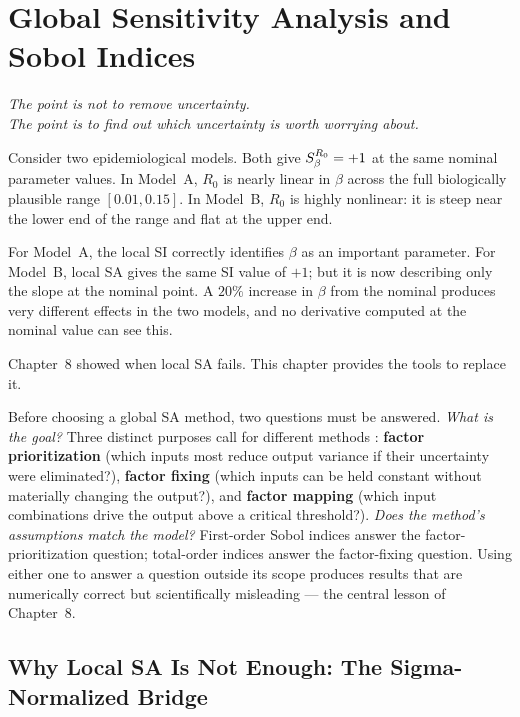 \chapter{Global Sensitivity Analysis and Sobol Indices}

\begin{flushright}
\textit{The point is not to remove uncertainty.\\
The point is to find out which uncertainty is worth worrying about.}
\end{flushright}

\bigskip

Consider two epidemiological models. Both give $S_{\beta}^{R_0} = +1$
at the same nominal parameter values. In Model~A, $R_0$ is nearly linear
in $\beta$ across the full biologically plausible range $[0.01, 0.15]$.
In Model~B, $R_0$ is highly nonlinear: it is steep near the lower end
of the range and flat at the upper end.

For Model~A, the local SI correctly identifies $\beta$ as an important
parameter. For Model~B, local SA gives the same SI value of $+1$;
but it is now describing only the slope at the nominal point.
A $20\%$ increase in $\beta$ from the nominal produces very different
effects in the two models, and no derivative computed at the nominal
value can see this.

Chapter~8 showed when local SA fails. This chapter provides the tools
to replace it.

Before choosing a global SA method, two questions must be answered.
\textit{What is the goal?} Three distinct purposes call for different methods
\cite{saltelli2004sensitivity,saltelli2008global}: \textbf{factor prioritization} (which inputs
most reduce output variance if their uncertainty were eliminated?),
\textbf{factor fixing} (which inputs can be held constant without materially
changing the output?), and \textbf{factor mapping} (which input combinations
drive the output above a critical threshold?).
\textit{Does the method's assumptions match the model?}
First-order Sobol indices answer the factor-prioritization question;
total-order indices answer the factor-fixing question.
Using either one to answer a question outside its scope produces results
that are numerically correct but scientifically misleading ---
the central lesson of Chapter~8.

\section{Why Local SA Is Not Enough: The Sigma-Normalized Bridge}
\label{sec:sigmanorm}

